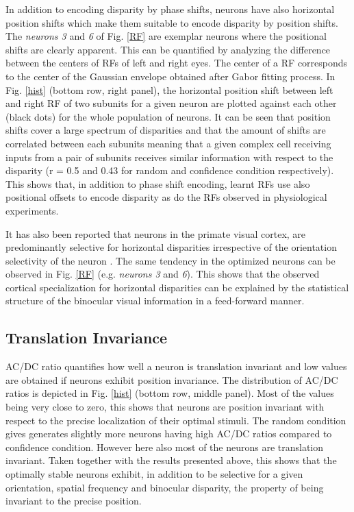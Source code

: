 {In addition to encoding disparity by phase shifts, neurons have also
horizontal position shifts which make them suitable to encode disparity by
position shifts. The \textit{neurons 3} and \textit{6} of Fig. \ref{RF}
are exemplar neurons where the positional shifts are clearly apparent. This
can be quantified by analyzing the difference between the centers of RFs of
left and right eyes. The center of a RF corresponds to the center of the
Gaussian envelope obtained after Gabor fitting process. In Fig. \ref{hist}
(bottom row, right panel), the horizontal position shift between left and
right RF of two subunits for a given neuron are plotted against each other
(black dots) for the whole population of neurons. It can be seen that
position shifts cover a large spectrum of disparities and that the amount
of shifts are correlated between each subunits meaning that a given complex
cell receiving inputs from a pair of subunits receives similar information
with respect to the disparity (r = 0.5 and 0.43 for random and confidence
condition respectively). This shows that, in addition to phase shift
encoding, learnt RFs use also positional offsets to encode disparity as do
the RFs observed in physiological experiments. 
	 
It has also been reported that neurons in the primate visual cortex, are
predominantly selective for horizontal disparities irrespective of the
orientation selectivity of the neuron \cite{cumming2002a}. The same
tendency in the optimized neurons can be observed in Fig. \ref{RF} (e.g.
\textit{neurons 3} and \textit{6}). This shows that the observed cortical
specialization for horizontal disparities can be explained by the
statistical structure of the binocular visual information in a feed-forward
manner.

\subsection{{Translation Invariance}}


AC/DC ratio quantifies how well a neuron is translation
invariant and low values are obtained if neurons exhibit position
invariance. The distribution of AC/DC ratios is depicted in Fig.
\ref{hist} (bottom row, middle panel). Most of the values being very close
to zero, this shows that neurons are position invariant with respect to the
precise localization of their optimal stimuli. The random condition gives
generates slightly more neurons having high AC/DC ratios compared to
confidence condition. However here also most of the neurons are translation
invariant. Taken together with the results presented above, this shows that
the optimally stable neurons exhibit, in addition to be selective for a
given orientation, spatial frequency and binocular disparity, the property
of being invariant to the precise position. 
	 
}

